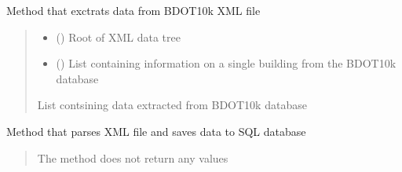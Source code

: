 \documentclass[letterpaper,10pt,english]{sphinxmanual}
\begin{document}
\begin{fulllineitems}
\begin{fulllineitems}
\label{\detokenize{xml_parsers:xml_parsers.BDOT10kDataParser.parse_bdot10k_xml}}
\pysigstartsignatures
{}
\pysigstopsignatures
\sphinxAtStartPar
Method that exctrats data from BDOT10k XML file
\begin{quote}\begin{description}
\begin{itemize}
\item {} 
\sphinxAtStartPar
{} () \textendash{} Root of XML data tree

\item {} 
\sphinxAtStartPar
{} (\sphinxcode{\sphinxupquote{List}}{[}\sphinxcode{\sphinxupquote{Any}}{]}) \textendash{} List containing information on a single building from the BDOT10k database

\end{itemize}

\sphinxAtStartPar
\sphinxcode{\sphinxupquote{List}}{[}\sphinxcode{\sphinxupquote{List}}{[}\sphinxcode{\sphinxupquote{Any}}{]}{]}

\sphinxAtStartPar
List contsining data extracted from BDOT10k database

\end{description}\end{quote}

\end{fulllineitems}


\begin{fulllineitems}
\label{\detokenize{xml_parsers:xml_parsers.BDOT10kDataParser.parse_xml}}
\pysigstartsignatures
{}
\pysigstopsignatures
\sphinxAtStartPar
Method that parses XML file and saves data to SQL database
\begin{quote}\begin{description}
\sphinxAtStartPar
{}

\sphinxAtStartPar
The method does not return any values

\end{description}\end{quote}

\end{fulllineitems}


\end{fulllineitems}
\end{document}
